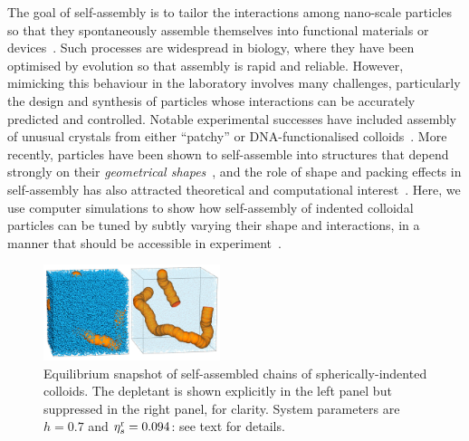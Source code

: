 \documentclass[8.5pt,oneside,onecolumn]{article}
\newcommand{\figurewidth}{0.46\textwidth}
\begin{document}
The goal of self-assembly is to tailor the interactions among
nano-scale particles so that they spontaneously assemble themselves
into functional materials or
devices~\cite{whitesides:2002,Glotzer2007}.  Such processes are
widespread in biology, where they have been optimised by evolution so
that assembly is rapid and reliable.  However, mimicking this
behaviour in the laboratory involves many challenges, particularly the
design and synthesis of particles whose interactions can be accurately
predicted and controlled.  Notable experimental successes have
included assembly of unusual crystals from either ``patchy'' or
DNA-functionalised colloids~\cite{Nykpanchuk08,Chen11}.  More
recently, particles have been shown to self-assemble into structures
that depend strongly on their \emph{geometrical
shapes}~\cite{Sacanna:2010ys,marechal2010,Rossi11,Henzie12,octapod12,sacanna13, Kraft12},
and the role of shape and packing effects in self-assembly has also
attracted theoretical and computational
interest~\cite{Damasceno12,Odriozola08-13,Torquato09,Henzie12,octapod12,Kraft12,marechal2010,
Ni12,Damasceno12-nano,Haji13,Gantapara13,Anders-arxiv13}.
Here, we use computer simulations to show how self-assembly of
indented colloidal particles can be tuned by subtly varying their
shape and interactions, in a manner that should be accessible in
experiment~\cite{Sacanna:2010ys}.

\begin{figure} 
  \includegraphics[width=\figurewidth]{Fig1.jpg}
  \caption{Equilibrium snapshot of self-assembled chains of spherically-indented colloids.  
  The depletant is shown explicitly in the left panel but suppressed in the right panel, for clarity.
  System parameters are $h=0.7$ and $\eta^{\rm r}_s=0.094$: see text for details. }
  \label{fig:snapshot0.3}
\end{figure}
\end{document}
